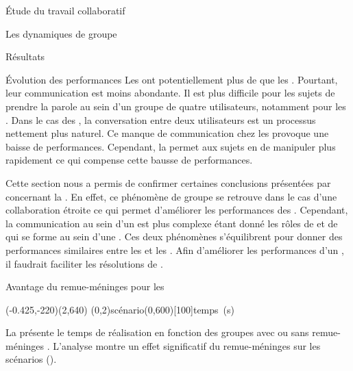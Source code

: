 \documentclass[myfrancais]{mythesis}
\begin{document}
\begin{mypart}{Étude du travail collaboratif}
\begin{mychapter}{Les dynamiques de groupe}
\begin{mysection}{Résultats}
\begin{mysubsection}{Évolution des performances}
					Les  ont potentiellement plus de  que les .
					Pourtant, leur communication est moins abondante.
					Il est plus difficile pour les sujets de prendre la parole au sein d'un groupe de quatre utilisateurs, notamment pour les .
					Dans le cas des , la conversation entre deux utilisateurs est un processus nettement plus naturel.
					Ce manque de communication chez les  provoque une baisse de performances.
					Cependant, la  permet aux sujets en  de manipuler plus rapidement ce qui compense cette bausse de performances.

					Cette section nous a permis de confirmer certaines conclusions présentées par  concernant la .
					En effet, ce phénomène de groupe se retrouve dans le cas d'une collaboration étroite ce qui permet d'améliorer les performances des .
					Cependant, la communication au sein d'un  est plus complexe étant donné les rôles de  et de  qui se forme au sein d'une .
					Ces deux phénomènes s'équilibrent pour donner des performances similaires entre les  et les .
					Afin d'améliorer les performances d'un , il faudrait faciliter les résolutions de .
				\end{mysubsection}
				\begin{mysubsection}{Avantage du remue-méninges pour les }
					\begin{myfigure}
						\begin{myps}(-0.425,-220)(2,640)
							\myaxes(0,2){scénario}(0,600)[100]{temps~(s)}
						\end{myps}
					\end{myfigure}

					La  présente le temps de réalisation  en fonction des groupes avec ou sans remue-méninges .
					L'analyse montre un effet significatif du remue-méninges  sur les scénarios  ().


\end{mysubsection}
\end{mysection}
\end{mychapter}
\end{mypart}
\end{document}
